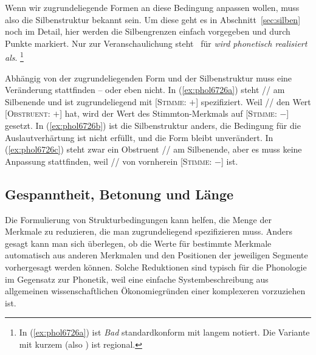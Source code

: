 
Wenn wir zugrundeliegende Formen an diese Bedingung anpassen wollen, muss also die Silbenstruktur bekannt sein.
Um diese geht es in Abschnitt~\ref{sec:silben} noch im Detail, hier werden die Silbengrenzen einfach vorgegeben und durch Punkte markiert.
Nur zur Veranschaulichung steht \phopro\ für \textit{wird phonetisch  realisiert als}.%
\footnote{In (\ref{ex:phol6726a}) ist \textit{Bad} standardkonform mit langem \textipa{[a:]} notiert.
Die Variante mit kurzem \textipa{[a]} (also \textipa{[bat]}) ist regional.}

\begin{exe}
  \ex\label{ex:phol6726}
  \begin{xlist}
  \end{xlist}
\end{exe}

Abhängig von der zugrundeliegenden Form und der Silbenstruktur muss eine Veränderung stattfinden -- oder eben nicht.
In (\ref{ex:phol6726a}) steht // am Silbenende und ist zugrundeliegend mit [\textsc{Stimme}: $+$] spezifiziert.
Weil // den Wert [\textsc{Obstruent}: $+$] hat, wird der Wert des Stimmton-Merkmals auf [\textsc{Stimme}: $-$] gesetzt.
In (\ref{ex:phol6726b}) ist die Silbenstruktur anders, die Bedingung für die Auslautverhärtung ist nicht erfüllt, und die Form bleibt unverändert.
In (\ref{ex:phol6726c}) steht zwar ein Obstruent // am Silbenende, aber es muss keine Anpassung stattfinden, weil // von vornherein [\textsc{Stimme}: $-$] ist.

\subsection{Gespanntheit, Betonung und Länge}

\label{sec:gespanntheitbetonunglaenge}

Die Formulierung von Strukturbedingungen kann helfen, die Menge der Merkmale zu reduzieren, die man zugrundeliegend spezifizieren muss.
Anders gesagt kann man sich überlegen, ob die Werte für bestimmte Merkmale automatisch aus anderen Merkmalen und den Positionen der jeweiligen Segmente vorhergesagt werden können.
Solche Reduktionen sind typisch für die Phonologie im Gegensatz zur Phonetik, weil eine einfache Systembeschreibung aus allgemeinen wissenschaftlichen Ökonomiegründen einer komplexeren vorzuziehen ist.

